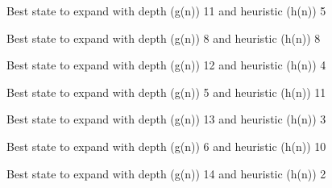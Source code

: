 \documentclass{article}
\begin{document}
{\noindent Best state to expand with depth (g(n)) 11 and heuristic (h(n)) 5\newline}
{}\newline

{\noindent Best state to expand with depth (g(n)) 8 and heuristic (h(n)) 8\newline}
{}\newline

{\noindent Best state to expand with depth (g(n)) 12 and heuristic (h(n)) 4\newline}
{}\newline

{\noindent Best state to expand with depth (g(n)) 5 and heuristic (h(n)) 11\newline}
{}\newline

{\noindent Best state to expand with depth (g(n)) 13 and heuristic (h(n)) 3\newline}
{}\newline

{\noindent Best state to expand with depth (g(n)) 6 and heuristic (h(n)) 10\newline}
{}\newline

{\noindent Best state to expand with depth (g(n)) 14 and heuristic (h(n)) 2\newline}
{}\newline
\end{document}
